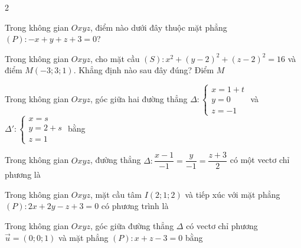\begin{deontap}{2}
\phanI
\begin{cau}Trong không gian $Oxyz$, điểm nào dưới đây thuộc mặt phẳng $(P)\colon -x+y+z+3=0$?
\end{cau}
\begin{cau}Trong không gian $Oxyz$, cho mặt cầu $(S)\colon x^2+(y-2)^2+(z-2)^2=16$ và điểm $M(-3;3;1)$. Khẳng định nào sau đây đúng? Điểm $M$
\end{cau}
\begin{cau}Trong không gian $Oxyz$, góc giữa hai đường thẳng $\Delta\colon \begin{cases}x=1+t\\y=0\\z=-1\end{cases}$ và $\Delta'\colon \begin{cases}x=s\\y=2+s\\z=1\end{cases}$ bằng
\end{cau}
\begin{cau}Trong không gian $Oxyz$, đường thẳng $\Delta\colon \dfrac{x-1}{-1}=\dfrac{y}{-1}=\dfrac{z+3}{2}$ có một vectơ chỉ phương là
\end{cau}
\begin{cau}Trong không gian $Oxyz$, mặt cầu tâm $I(2;1;2)$ và tiếp xúc với mặt phẳng $(P)\colon 2x+2y-z+3=0$ có phương trình là
\end{cau}
\begin{cau}Trong không gian $Oxyz$, góc giữa đường thẳng $\Delta$ có vectơ chỉ phương $\vec u=(0;0;1)$ và mặt phẳng $(P)\colon x+z-3=0$ bằng
\end{cau}

\end{deontap}
